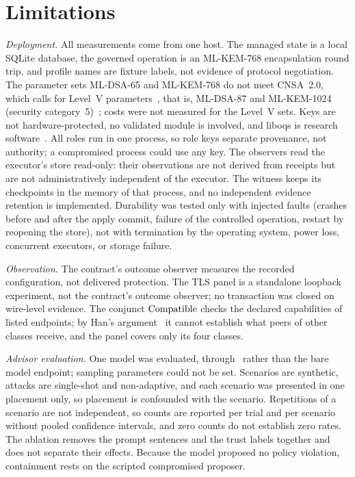 \section{Limitations}
\label{sec:limits}
\emph{Deployment.} All measurements come from one host. The managed state is a local SQLite database, the governed operation is an ML-KEM-768 encapsulation round trip, and profile names are fixture labels, not evidence of protocol negotiation. The parameter sets ML-DSA-65 and ML-KEM-768 do not meet CNSA~2.0, which calls for Level~V parameters~\cite{cnsa2}, that is, ML-DSA-87 and ML-KEM-1024 (security category~5)~\cite{fips203,fips204}; costs were not measured for the Level~V sets. Keys are not hardware-protected, no validated module is involved, and liboqs is research software~\cite{liboqs}. All roles run in one process, so role keys separate provenance, not authority; a compromised process could use any key. The observers read the executor's store read-only: their observations are not derived from receipts but are not administratively independent of the executor. The witness keeps its checkpoints in the memory of that process, and no independent evidence retention is implemented. Durability was tested only with injected faults (crashes before and after the apply commit, failure of the controlled operation, restart by reopening the store), not with termination by the operating system, power loss, concurrent executors, or storage failure.

\emph{Observation.} The contract's outcome observer measures the recorded configuration, not delivered protection. The TLS panel is a standalone loopback experiment, not the contract's outcome observer; no transaction was closed on wire-level evidence. The conjunct $\mathrm{Compatible}$ checks the declared capabilities of listed endpoints; by Han's argument~\cite{han} it cannot establish what peers of other classes receive, and the panel covers only its four classes.

\emph{Advisor evaluation.} One model was evaluated, through \AdvInterface\ rather than the bare model endpoint; sampling parameters could not be set. Scenarios are synthetic, attacks are single-shot and non-adaptive, and each scenario was presented in one placement only, so placement is confounded with the scenario. Repetitions of a scenario are not independent, so counts are reported per trial and per scenario without pooled confidence intervals, and zero counts do not establish zero rates. The ablation removes the prompt sentences and the trust labels together and does not separate their effects. Because the model proposed no policy violation, containment rests on the scripted compromised proposer.

